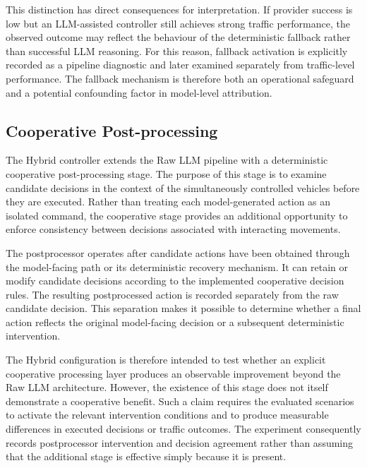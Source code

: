 \documentclass[letterpaper,10pt,conference]{ieeeconf}
\begin{document}
This distinction has direct consequences for interpretation. If provider success is low but an LLM-assisted controller still achieves strong traffic performance, the observed outcome may reflect the behaviour of the deterministic fallback rather than successful LLM reasoning. For this reason, fallback activation is explicitly recorded as a pipeline diagnostic and later examined separately from traffic-level performance. The fallback mechanism is therefore both an operational safeguard and a potential confounding factor in model-level attribution.



\subsection{Cooperative Post-processing}



The Hybrid controller extends the Raw LLM pipeline with a deterministic cooperative post-processing stage. The purpose of this stage is to examine candidate decisions in the context of the simultaneously controlled vehicles before they are executed. Rather than treating each model-generated action as an isolated command, the cooperative stage provides an additional opportunity to enforce consistency between decisions associated with interacting movements.



The postprocessor operates after candidate actions have been obtained through the model-facing path or its deterministic recovery mechanism. It can retain or modify candidate decisions according to the implemented cooperative decision rules. The resulting postprocessed action is recorded separately from the raw candidate decision. This separation makes it possible to determine whether a final action reflects the original model-facing decision or a subsequent deterministic intervention.



The Hybrid configuration is therefore intended to test whether an explicit cooperative processing layer produces an observable improvement beyond the Raw LLM architecture. However, the existence of this stage does not itself demonstrate a cooperative benefit. Such a claim requires the evaluated scenarios to activate the relevant intervention conditions and to produce measurable differences in executed decisions or traffic outcomes. The experiment consequently records postprocessor intervention and decision agreement rather than assuming that the additional stage is effective simply because it is present.
\end{document}
